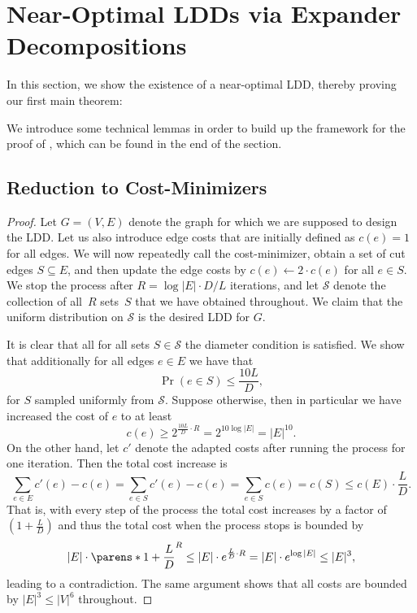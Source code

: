 \section{Near-Optimal LDDs via Expander Decompositions} \label{sec:ldd-expander}

In this section, we show the existence of a near-optimal LDD, thereby proving our first main theorem: 

\thmMainExistential*

We introduce some technical lemmas in order to build up the framework for the proof of , which can be found in the end of the section.


\subsection{Reduction to Cost-Minimizers}

\mwu*

\begin{proof}
	Let $G = (V, E)$ denote the graph for which we are supposed to design the LDD. Let us also introduce edge costs that are initially defined as $c(e) = 1$ for all edges. We will now repeatedly call the cost-minimizer, obtain a set of cut edges $S \subseteq E$, and then update the edge costs by $c(e) \gets 2 \cdot c(e)$ for all $e \in S$. We stop the process after $R = \log |E| \cdot D/L$ iterations, and let $\mathcal S$ denote the collection of all~$R$ sets~$S$ that we have obtained throughout. We claim that the uniform distribution on $\mathcal S$ is the desired LDD for $G$.
	
	It is clear that all for all sets $S \in \mathcal S$ the diameter condition is satisfied. We show that additionally for all edges $e \in E$ we have that
	\begin{equation*}
		\Pr(e \in S) \leq \frac{10L}{D},
	\end{equation*}
	for $S$ sampled uniformly from $\mathcal S$. Suppose otherwise, then in particular we have increased the cost of $e$ to at least
	\begin{equation*}
		c(e) \geq 2^{\frac{10L}{D} \cdot R} = 2^{10 \log |E|} = |E|^{10}.
	\end{equation*}
	On the other hand, let $c'$ denote the adapted costs after running the process for one iteration. Then the total cost increase is
	\begin{equation*}
		\sum_{e \in E} c'(e) - c(e) = \sum_{e \in S} c'(e) - c(e) = \sum_{e \in S} c(e) = c(S) \leq c(E) \cdot \frac{L}{D}.
	\end{equation*}
	That is, with every step of the process the total cost increases by a factor of $(1 + \frac{L}{D})$ and thus the total cost when the process stops is bounded by
	\begin{equation*}
		|E| \cdot \parens*{1 + \frac{L}{D}}^R \leq |E| \cdot e^{\frac{L}{D} \cdot R} = |E| \cdot e^{\log |E|} \leq |E|^3,
	\end{equation*}
	leading to a contradiction. The same argument shows that all costs are bounded by $|E|^3 \leq |V|^6$ throughout.
\end{proof}

